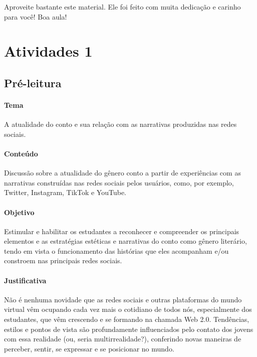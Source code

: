 \documentclass[12pt]{extarticle}
\begin{document}
{Aproveite bastante este material. Ele foi feito com muita dedicação e
carinho para você! Boa aula!

\reversemarginpar
\marginparwidth=5cm


\section{Atividades 1}

\subsection{Pré-leitura}


\paragraph{Tema} A atualidade do conto e sua relação com as narrativas
  produzidas nas redes sociais.


\paragraph{Conteúdo} Discussão sobre a atualidade do gênero conto a partir
de experiências com as narrativas construídas nas redes sociais pelos
usuários, como, por exemplo, Twitter, Instagram, TikTok e YouTube.

\paragraph{Objetivo} Estimular e habilitar os estudantes a reconhecer e
compreender os principais elementos e as estratégias estéticas e
narrativas do conto como gênero literário, tendo em vista o
funcionamento das histórias que eles acompanham e/ou constroem nas
principais redes sociais.

\paragraph{Justificativa} Não é nenhuma novidade que as redes sociais e
outras plataformas do mundo virtual vêm ocupando cada vez mais o
cotidiano de todos nós, especialmente dos estudantes, que vêm crescendo
e se formando na chamada Web 2.0. Tendências, estilos e pontos de vista
são profundamente influenciados pelo contato dos jovens com essa
realidade (ou, seria multirrealidade?), conferindo novas maneiras de
perceber, sentir, se expressar e se posicionar no mundo.

}
\end{document}
